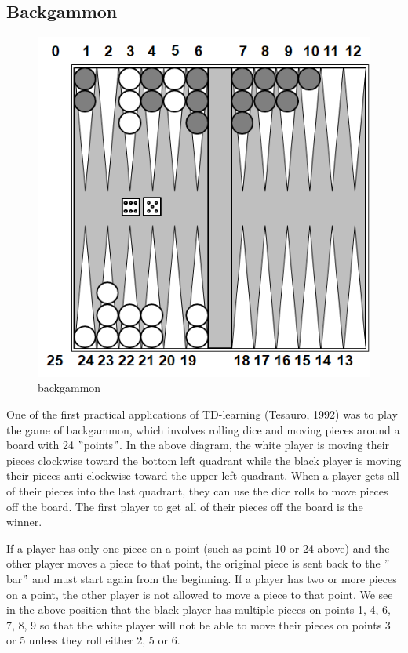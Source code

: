 \documentclass[11pt]{article}
\begin{document}
\subsection{Backgammon}\label{subsec:backgammon}

\begin{figure}[h]
    \centering
    \includegraphics[width=\textwidth]{../out/images/backgammon}
    \caption[backgammon]{backgammon}
    \label{fig:backgammon}
\end{figure}

One of the first practical applications of TD-learning (Tesauro, 1992) was to
play the game of backgammon, which involves rolling dice and moving pieces
around a board with 24 \("\)points\("\).
In the above diagram, the white player is moving their pieces clockwise toward
the bottom left quadrant while the black player is moving their pieces
anti-clockwise toward the upper left quadrant.
When a player gets all of their pieces into the last quadrant, they can use the
dice rolls to move pieces off the board.
The first player to get all of their pieces off the board is the winner.

If a player has only one piece on a point (such as point 10 or 24 above) and
the other player moves a piece to that point, the original piece is sent back
to the \("\)bar\("\) and must start again from the beginning.
If a player has two or more pieces on a point, the other player is not allowed
to move a piece to that point.
We see in the above position that the black player has multiple pieces on
points 1, 4, 6, 7, 8, 9 so that the white player will not be able to move their
pieces on points 3 or 5 unless they roll either 2, 5 or 6.
\end{document}
